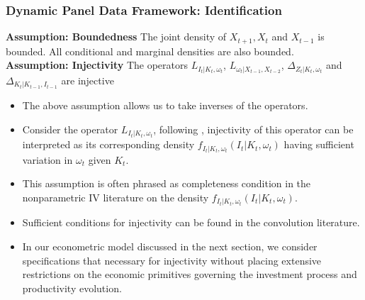 \documentclass{beamer}
\begin{document}
\begin{frame}
\frametitle{Dynamic Panel Data Framework: Identification}
\textbf{Assumption: Boundedness}
The joint density of $X_{t+1}, X_{t}$ and $X_{t-1}$ is bounded. All conditional and marginal densities are also bounded.\\
\textbf{Assumption: Injectivity}
The operators $L_{I_{t}|K_{t}, \omega_{t}}$, $L_{\omega_{t}|X_{t-1}, X_{t-2}}$, $\Delta_{Z_{t}|K_{t}, \omega_{t}}$ and $\Delta_{K_{t}|K_{t-1}, I_{t-1}}$ are injective
\begin{itemize}
\item The above assumption allows us to take inverses of the operators. 
\item Consider the operator $L_{I_{t}|K_{t}, \omega_{t}}$, following \cite{Hu2008}, injectivity of this operator can be interpreted as its corresponding density $f_{I_{t}|K_{t}, \omega_{t}}(I_{t}|K_{t}, \omega_{t})$ having sufficient variation in $\omega_{t}$ given $K_{t}$. 
\item This assumption is often phrased as completeness condition in the nonparametric IV literature on the density $f_{I_{t}|K_{t}, \omega_{t}}(I_{t}|K_{t}, \omega_{t})$.
\item Sufficient conditions for injectivity can be found in the convolution literature. 
\item In our econometric model discussed in the next section, we consider specifications that necessary for injectivity without placing extensive restrictions on the economic primitives governing the investment process and productivity evolution.
\end{itemize}
\end{frame}

\end{document}
